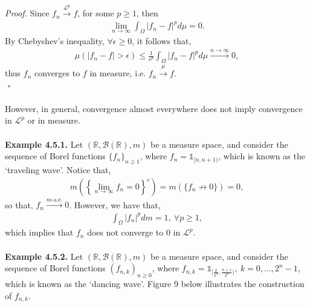 \documentclass{article}
\begin{document}
\noindent{}\\\\\\
\textit{Proof.} Since $f_n \xrightarrow{\mathcal{L}^p} f$, for some $p \geq 1$, then
\begin{eqnarray}
\nonumber
\lim_{n\to\infty}\int_\Omega |f_n - f|^p d\mu = 0.
\end{eqnarray}
By Chebyshev's inequality, $\forall \epsilon \geq 0$, it follows that,
\begin{eqnarray}
\nonumber
\mu(|f_n - f| > \epsilon) \leq \frac{1}{\epsilon^p}\int_\Omega |f_n-f|^p d\mu \xrightarrow{n\to\infty} 0,
\end{eqnarray}
thus $f_n$ converges to $f$ in measure, i.e. $f_n \xrightarrow{\mu} f$.\\
${}$ \hfill $\square$ \\\\
However, in general, convergence almost everywhere does not imply convergence in $\mathcal{L}^p$ or in measure.\\\\
\textbf{Example 4.5.1.} Let $(\mathbb{R},\mathcal{B}(\mathbb{R}),m)$ be a measure space, and consider the sequence of Borel functions $\{f_n\}_{n\geq1}$, where $f_n = \mathds{1}_{[n,n+1)}$, which is known as the ‘traveling wave’. Notice that,
\begin{eqnarray}
\nonumber
m\left(\left\{\lim_{n\to\infty}f_n = 0\right\}^c\right) = m(\{f_n \nrightarrow 0\}) = 0,
\end{eqnarray}
so that, $f_n \xrightarrow{m\text{-a.e.}} 0$. However, we have that,
\begin{eqnarray}
\nonumber
\int_\Omega |f_n|^p dm = 1, \ \forall p \geq 1,
\end{eqnarray}
which implies that $f_n$ does not converge to $0$ in $\mathcal{L}^p$.\\\\
\textbf{Example 4.5.2.} Let $(\mathbb{R},\mathcal{B}(\mathbb{R}),m)$ be a measure space, and consider the sequence of Borel functions $(f_{n,k})_{n\geq0}$, where $f_{n,k} = \mathds{1}_{[\frac{k}{2^n},\frac{k+1}{2^n})}, \ k = 0,...,2^n-1$, which is known as the ‘dancing wave’. Figure 9 below illustrates the construction of $f_{n,k}$.
\end{document}
